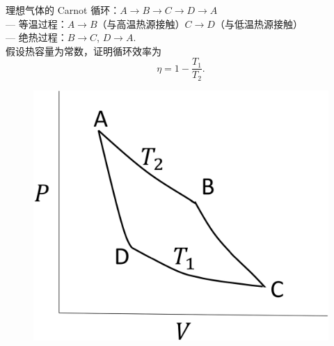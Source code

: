 \documentclass{assignment}
\begin{document}
\begin{prob}
    理想气体的 Carnot 循环：$A\rightarrow B\rightarrow C\rightarrow D\rightarrow A$\\
    --- 等温过程：$A\rightarrow B$（与高温热源接触）$C\rightarrow D$（与低温热源接触）\\
    --- 绝热过程：$B\rightarrow C$, $D\rightarrow A$.\\
    假设热容量为常数，证明循环效率为
    \[
        \eta=1-\frac{T_1}{T_2}.
    \]
    \begin{figure}[h]
        \centering
        \includegraphics[width=.4\columnwidth]{A1-P3.png}
    \end{figure}
\end{prob}
\end{document}
